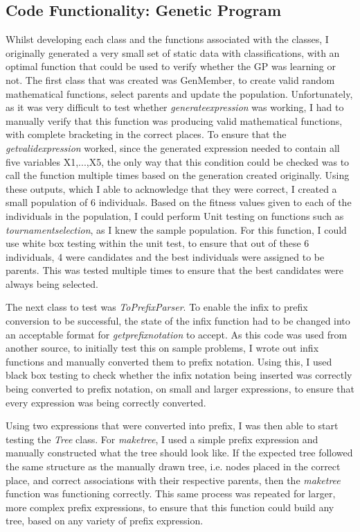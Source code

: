 \documentclass[11pt]{article}
\begin{document}
\subsection{Code Functionality: Genetic Program}
Whilst developing each class and the functions associated with the classes, I originally generated a very small set of static data with classifications, with an optimal function that could be used to verify whether the GP was learning or not. 
The first class that was created was GenMember, to create valid random mathematical functions, select parents and update the population. Unfortunately, as it was very difficult to test whether \textit{generate\textunderscore expression} was working, I had to manually verify that this function was producing valid mathematical functions, with complete bracketing in the correct places. To ensure that the \textit{get\textunderscore valid\textunderscore expression} worked, since the generated expression needed to contain all five variables X1,...,X5, the only way that this condition could be checked was to call the function multiple times based on the generation created originally. Using these outputs, which I able to acknowledge that they were correct, I created a small population of 6 individuals. Based on the fitness values given to each of the individuals in the population, I could perform Unit testing on functions such as \textit{tournament\textunderscore selection}, as I knew the sample population. For this function, I could use white box testing within the unit test, to ensure that out of these 6 individuals, 4 were candidates and the best individuals were assigned to be parents. This was tested multiple times to ensure that the best candidates were always being selected. 
 
The next class to test was \textit{ToPrefixParser}. To enable the infix to prefix conversion to be successful, the state of the infix function had to be changed into an acceptable format for 
\textit{get\textunderscore prefix\textunderscore notation} to accept. As this code was used from another source, to initially test this on sample problems, I wrote out infix functions and manually converted them to prefix notation. Using this, I used black box testing to check whether the infix notation being inserted was correctly being converted to prefix notation, on small and larger expressions, to ensure that every expression was being correctly converted. 

Using two expressions that were converted into prefix, I was then able to start testing the \textit{Tree} class. For \textit{make\textunderscore tree}, I used a simple prefix expression
and manually constructed what the tree should look like. If the expected tree followed the same structure as the manually drawn tree, i.e. nodes placed in the correct place, and correct associations with their respective parents, then the \textit{make\textunderscore tree} function was functioning correctly.  This same process was repeated for larger, more complex prefix expressions, to ensure that this function could build any tree, based on any variety of prefix expression.  
\end{document}
